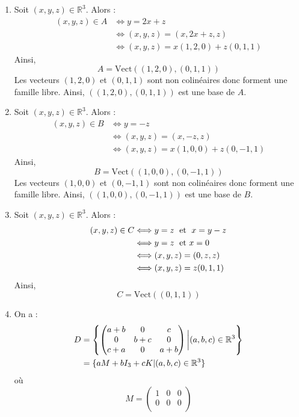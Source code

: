 \documentclass[a4paper,10pt]{report}
\begin{document}
\begin{enumerate}
\item Soit $(x,y,z) \in \mathbb{R}^3$. Alors :
\begin{align*}
(x,y,z) \in A& \Longleftrightarrow y=2x+z \\
& \Longleftrightarrow (x,y,z)=(x,2x+z,z) \\
& \Longleftrightarrow (x,y,z) = x (1,2,0) + z(0,1,1)
\end{align*}
Ainsi,
$$ A = \textrm{Vect}((1,2,0),(0,1,1))$$
Les vecteurs $(1,2,0)$ et $(0,1,1)$ sont non colinéaires donc forment une famille libre. Ainsi, $((1,2,0),(0,1,1))$ est une base de $A$.

\item Soit $(x,y,z) \in \mathbb{R}^3$. Alors :
\begin{align*}
(x,y,z) \in B&\Longleftrightarrow y=-z \\
& \Longleftrightarrow (x,y,z)=(x,-z,z) \\
& \Longleftrightarrow (x,y,z) = x (1,0,0) + z (0,-1,1) 
\end{align*}
Ainsi,
$$ B = \textrm{Vect}((1,0,0),(0,-1,1))$$
Les vecteurs $(1,0,0)$ et $(0,-1,1)$ sont non colinéaires donc forment une famille libre. Ainsi, $((1,0,0),(0,-1,1))$ est une base de $B$.
\item Soit $(x,y,z) \in \mathbb{R}^3$. Alors :
\begin{align*}
(x,y,z) \in C&\Longleftrightarrow y=z \; \hbox{ et } \; x=y-z \\
& \Longleftrightarrow y=z \; \hbox{ et }  x=0 \\
& \Longleftrightarrow (x,y,z)= (0,z,z) \\
& \Longleftrightarrow (x,y,z)= z (0,1,1)
\end{align*}
Ainsi,
$$C = \textrm{Vect}((0,1,1))$$
\item On a :
\begin{align*}
D & = \left\lbrace \begin{pmatrix}
a+b & 0 & c \\
0 & b+c & 0 \\
c+a & 0& a+b 
\end{pmatrix} \bigg{\vert} (a,b,c) \in \mathbb{R}^3 \right\rbrace \\
& = \lbrace a M + b I_3 + c K \vert (a,b,c) \in \mathbb{R}^3 \rbrace 
\end{align*}
où 
$$ M = \begin{pmatrix}
1 & 0 & 0 \\
0 & 0 & 0 \\

\end{pmatrix}$$
\end{enumerate}
\end{document}
